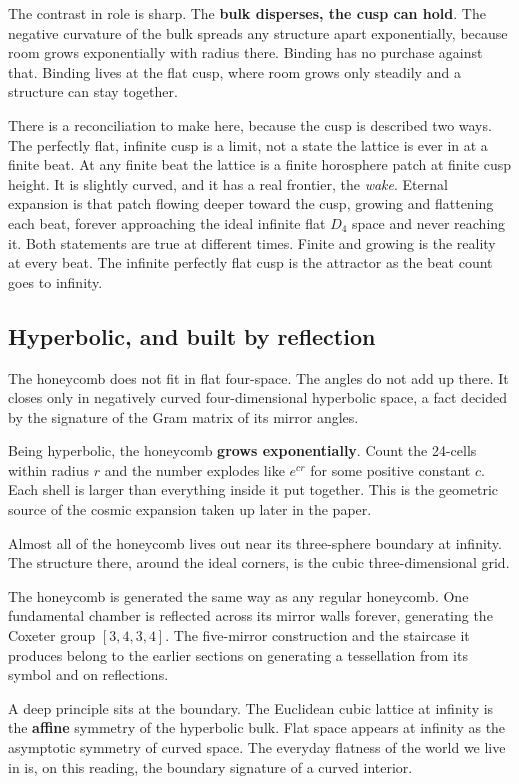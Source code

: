 The contrast in role is sharp. The \textbf{bulk disperses, the cusp can hold}. The negative curvature of the bulk spreads any structure apart exponentially, because room grows exponentially with radius there. Binding has no purchase against that. Binding lives at the flat cusp, where room grows only steadily and a structure can stay together.

There is a reconciliation to make here, because the cusp is described two ways. The perfectly flat, infinite cusp is a limit, not a state the lattice is ever in at a finite beat. At any finite beat the lattice is a finite horosphere patch at finite cusp height. It is slightly curved, and it has a real frontier, the \emph{wake}. Eternal expansion is that patch flowing deeper toward the cusp, growing and flattening each beat, forever approaching the ideal infinite flat $D_4$ space and never reaching it. Both statements are true at different times. Finite and growing is the reality at every beat. The infinite perfectly flat cusp is the attractor as the beat count goes to infinity.

\subsection{Hyperbolic, and built by reflection}

The honeycomb does not fit in flat four-space. The angles do not add up there. It closes only in negatively curved four-dimensional hyperbolic space, a fact decided by the signature of the Gram matrix of its mirror angles.

Being hyperbolic, the honeycomb \textbf{grows exponentially}. Count the 24-cells within radius $r$ and the number explodes like $e^{c r}$ for some positive constant $c$. Each shell is larger than everything inside it put together. This is the geometric source of the cosmic expansion taken up later in the paper.

Almost all of the honeycomb lives out near its three-sphere boundary at infinity. The structure there, around the ideal corners, is the cubic three-dimensional grid.

The honeycomb is generated the same way as any regular honeycomb. One fundamental chamber is reflected across its mirror walls forever, generating the Coxeter group $[3,4,3,4]$. The five-mirror construction and the staircase it produces belong to the earlier sections on generating a tessellation from its symbol and on reflections.

A deep principle sits at the boundary. The Euclidean cubic lattice at infinity is the \textbf{affine} symmetry of the hyperbolic bulk. Flat space appears at infinity as the asymptotic symmetry of curved space. The everyday flatness of the world we live in is, on this reading, the boundary signature of a curved interior.

